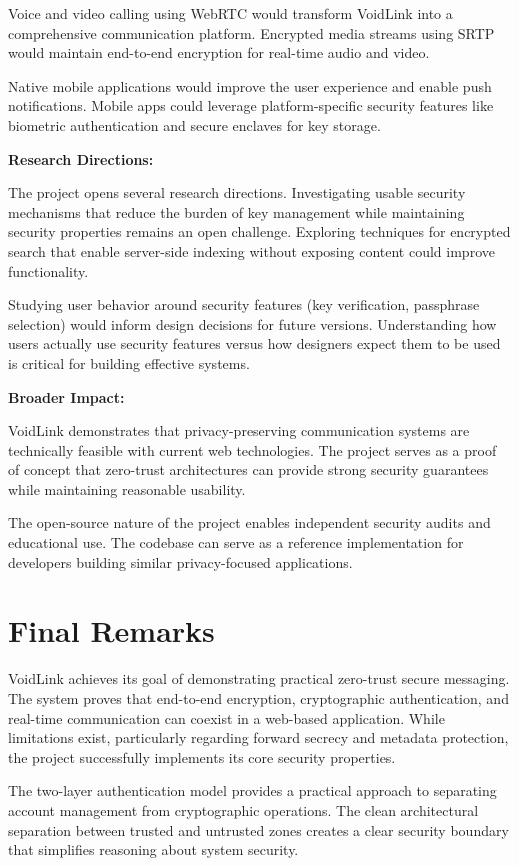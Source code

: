 Voice and video calling using WebRTC would transform VoidLink into a comprehensive communication platform. Encrypted media streams using SRTP would maintain end-to-end encryption for real-time audio and video.

Native mobile applications would improve the user experience and enable push notifications. Mobile apps could leverage platform-specific security features like biometric authentication and secure enclaves for key storage.

\textbf{Research Directions:}

The project opens several research directions. Investigating usable security mechanisms that reduce the burden of key management while maintaining security properties remains an open challenge. Exploring techniques for encrypted search that enable server-side indexing without exposing content could improve functionality.

Studying user behavior around security features (key verification, passphrase selection) would inform design decisions for future versions. Understanding how users actually use security features versus how designers expect them to be used is critical for building effective systems.

\textbf{Broader Impact:}

VoidLink demonstrates that privacy-preserving communication systems are technically feasible with current web technologies. The project serves as a proof of concept that zero-trust architectures can provide strong security guarantees while maintaining reasonable usability.

The open-source nature of the project enables independent security audits and educational use. The codebase can serve as a reference implementation for developers building similar privacy-focused applications.

\section*{Final Remarks}

VoidLink achieves its goal of demonstrating practical zero-trust secure messaging. The system proves that end-to-end encryption, cryptographic authentication, and real-time communication can coexist in a web-based application. While limitations exist, particularly regarding forward secrecy and metadata protection, the project successfully implements its core security properties.

The two-layer authentication model provides a practical approach to separating account management from cryptographic operations. The clean architectural separation between trusted and untrusted zones creates a clear security boundary that simplifies reasoning about system security.

